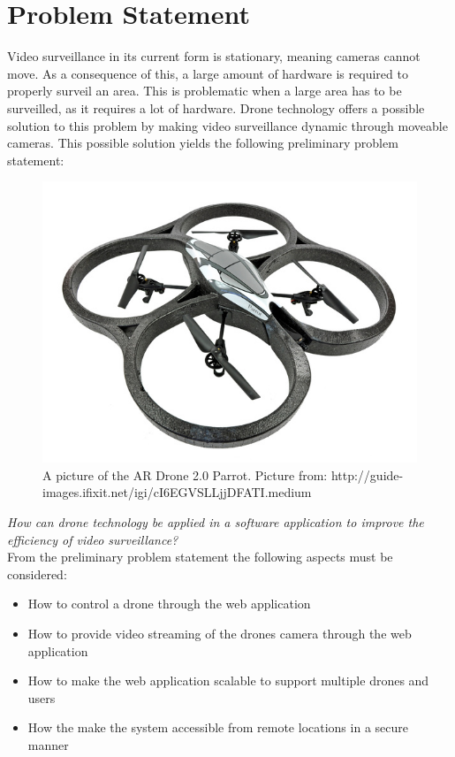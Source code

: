 \section{Problem Statement}
\label{sec:problem_definition}
Video surveillance in its current form is stationary, meaning cameras cannot move.
As a consequence of this, a large amount of hardware is required to properly surveil an area.
This is problematic when a large area has to be surveilled, as it requires a lot of hardware.
Drone technology offers a possible solution to this problem by making video surveillance dynamic through moveable cameras.
This possible solution yields the following preliminary problem statement:\\

\begin{figure}[htb]
    \centering
    \includegraphics[width=\textwidth]{gfx/drone.jpg}
    \caption{A picture of the AR Drone 2.0 Parrot. Picture from: http://guide-images.ifixit.net/igi/cI6EGVSLLjjDFATI.medium}
    \label{fig:pic_of_drone}
\end{figure}

\textit{How can drone technology be applied in a software application to improve the efficiency of video surveillance?}\\

From the preliminary problem statement the following aspects must be considered:
\begin{itemize}
	\item How to control a drone through the web application
	\item How to provide video streaming of the drones camera through the web application
	\item How to make the web application scalable to support multiple drones and users
	\item How the make the system accessible from remote locations in a secure manner
\end{itemize}


